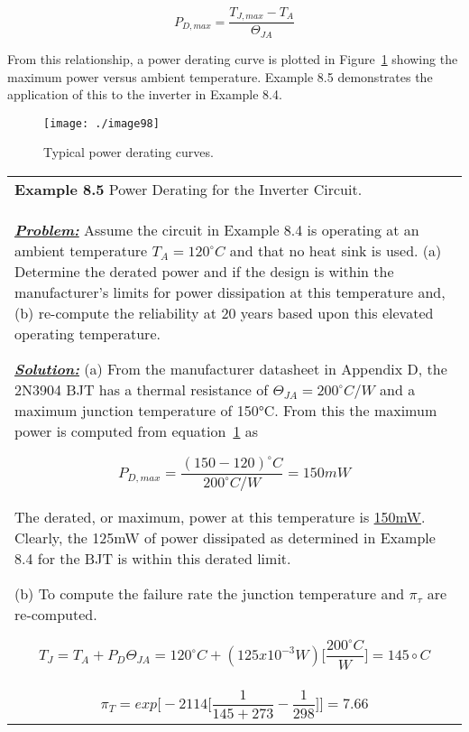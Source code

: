 {\begin{equation}
\label{equ:powerFunctionTemperature}
P_{D,max} = \frac{T_{J,max}  - T_A}{\Theta_{JA}}
\end{equation}

From this relationship, a power derating curve is plotted in 
Figure~\ref{figure:typicalDeratingCurve}
showing the maximum power versus ambient temperature. Example 8.5
demonstrates the application of this to the inverter in Example 8.4.

\begin{figure}
\texttt{[image: ./image98]}
\caption{Typical power derating curves.}
\label{figure:typicalDeratingCurve}
\end{figure}

\begin{table}
\begin{tabular}{m{15cm}|}
\textbf{Example 8.5} 
Power Derating for the Inverter Circuit.\\

\emph{\textbf{\ul{Problem:}}} Assume the circuit in Example 8.4 is
operating at an ambient temperature $T_A = 120^\circ C$ and 
that no heat sink is used.
(a) Determine the derated power and if the design is within the
manufacturer's limits for power dissipation at this temperature and, (b)
re-compute the reliability at 20 years based upon this elevated
operating temperature.

\emph{\textbf{\ul{Solution:}}}
(a) From the manufacturer datasheet in Appendix D, the 2N3904 BJT has a
thermal resistance of $\Theta_{JA} = 200^\circ C/W$ and a
maximum junction temperature of 150°C. From this the maximum power is
computed from equation~\ref{figure:typicalDeratingCurve} as

$$P_{D,max} = \frac{(150 - 120)^\circ C}{200^\circ C/W} = 150mW$$

The derated, or maximum, power at this temperature is \ul{150mW}.
Clearly, the 125mW of power dissipated as determined in Example 8.4 for
the BJT is within this derated limit.

(b) To compute the failure rate the junction temperature and
$\pi_\tau$ are re-computed.

$$T_J = T_A + P_D\Theta_{JA} = 120^\circ C + (125x10^{-3} W) \big[ \frac{200^\circ C}{W} \big]= 145\circ C $$\\
$$\pi_T = exp\big[ -2114 \big[ \frac{1}{145+273} - \frac{1}{298} \big] \big] = 7.66$$
\end{tabular}
\end{table}

}
